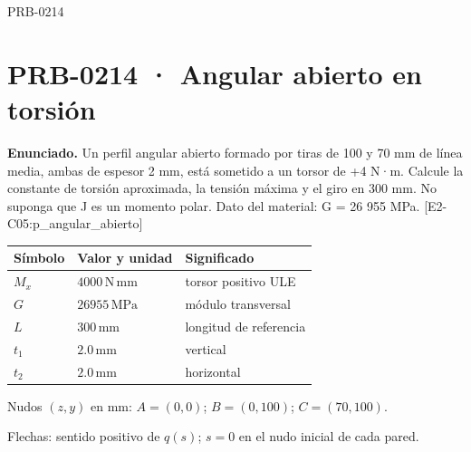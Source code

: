 \begin{studiumworked}{PRB-0214}

\section{PRB-0214 · Angular abierto en torsión}

\textbf{Enunciado.} Un perfil angular abierto formado por tiras de 100 y 70 mm de línea media, ambas de espesor 2 mm, está sometido a un torsor de +4 N·m. Calcule la constante de torsión aproximada, la tensión máxima y el giro en 300 mm. No suponga que J es un momento polar. Dato del material: G = 26 955 MPa. [E2-C05:p\_angular\_abierto]

\par\medskip\noindent\begin{tabular}{@{}p{.18\linewidth}p{.26\linewidth}p{.48\linewidth}@{}}
\toprule Símbolo & Valor y unidad & Significado\\\midrule
$M_{x}$ & $4000\,\mathrm{N\,mm}$ & torsor positivo ULE\\
$G$ & $26955\,\mathrm{MPa}$ & módulo transversal\\
$L$ & $300\,\mathrm{mm}$ & longitud de referencia\\
$t_{1}$ & $2.0\,\mathrm{mm}$ & vertical\\
$t_{2}$ & $2.0\,\mathrm{mm}$ & horizontal\\
\bottomrule\end{tabular}\par\medskip

\par\medskip\noindent\begin{minipage}{\linewidth}\centering
{}
\par\small Nudos $(z,y)$ en mm: $A=(0,0)$; $B=(0,100)$; $C=(70,100)$.
\par\small Flechas: sentido positivo de $q(s)$; $s=0$ en el nudo inicial de cada pared.
\par\normalsize\end{minipage}\par\medskip


\end{studiumworked}
